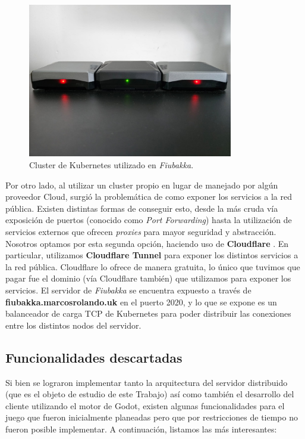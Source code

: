 \begin{figure}[htbp]
    \centering
    \includegraphics[width=0.8\textwidth]{../assets/fiubakka-cluster-pis.png}
    \caption{Cluster de Kubernetes utilizado en \textit{Fiubakka}.}
\end{figure}

Por otro lado, al utilizar un cluster propio en lugar de manejado por algún proveedor Cloud, surgió la problemática de como exponer los servicios a la red pública. Existen distintas formas de conseguir esto, desde la más cruda vía
exposición de puertos (conocido como \textit{Port Forwarding}) hasta la utilización de servicios externos que ofrecen \textit{proxies} para mayor seguridad y abstracción. Nosotros optamos por esta segunda opción, haciendo uso de
\textbf{Cloudflare} \label{ref:cloudflare}. En particular, utilizamos \textbf{Cloudflare Tunnel} para exponer los distintos servicios a la red pública. Cloudflare lo ofrece de manera gratuita, lo único que tuvimos que pagar fue el dominio (vía Cloudflare
también) que utilizamos para exponer los servicios. El servidor de \textit{Fiubakka} se encuentra expuesto a través de \textbf{fiubakka.marcosrolando.uk} en el puerto 2020, y lo que se expone es un balanceador de carga TCP de Kubernetes
para poder distribuir las conexiones entre los distintos nodos del servidor.

\subsection{Funcionalidades descartadas}

Si bien se lograron implementar tanto la arquitectura del servidor distribuido (que es el objeto
de estudio de este Trabajo) así como también el desarrollo del cliente utilizando el motor de Godot, existen algunas funcionalidades para el juego que fueron inicialmente
planeadas pero que por restricciones de tiempo no fueron posible implementar. A continuación, listamos 
las más interesantes:

